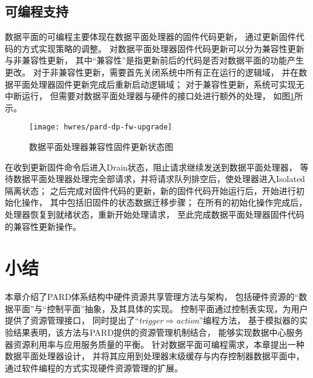 \subsection{可编程支持}

数据平面的可编程主要体现在数据平面处理器的固件代码更新，
通过更新固件代码的方式实现策略的调整。
对数据平面处理器固件代码更新可以分为兼容性更新与非兼容性更新，
其中``兼容性''是指更新前后的代码是否对数据平面的功能产生更改。
对于非兼容性更新，需要首先关闭系统中所有正在运行的逻辑域，
并在数据平面处理器固件更新完成后重新启动逻辑域；
对于兼容性更新，系统可实现无中断运行，
但需要对数据平面处理器与硬件的接口处进行额外的处理，
如图\ref{fig:pard-dp-fw-upgrade}所示。

\begin{figure}[htb]
  \centering
  \texttt{[image: hwres/pard-dp-fw-upgrade]}
  \caption{数据平面处理器兼容性固件更新状态图}
  \label{fig:pard-dp-fw-upgrade}
\end{figure}

在收到更新固件命令后进入Drain状态，阻止请求继续发送到数据平面处理器，
等待数据平面处理器处理完全部请求，并将请求队列排空后，使处理器进入Isolated隔离状态；
之后完成对固件代码的更新，新的固件代码开始运行后，开始进行初始化操作，
其中包括旧固件的状态数据迁移步骤；
在所有的初始化操作完成后，处理器恢复到就绪状态，重新开始处理请求，
至此完成数据平面处理器固件代码的兼容性更新操作。


\section{小结}

本章介绍了PARD体系结构中硬件资源共享管理方法与架构，
包括硬件资源的``数据平面''与``控制平面''抽象，及其具体的实现。
控制平面通过控制表实现，为用户提供了资源管理接口，
同时提出了``\emph{trigger$\Rightarrow$action}''编程方法，
基于模拟器的实验结果表明，该方法与PARD提供的资源管理机制结合，
能够实现数据中心服务器资源利用率与应用服务质量的平衡。
针对数据平面可编程需求，本章提出一种数据平面处理器设计，
并将其应用到处理器末级缓存与内存控制器数据平面中，
通过软件编程的方式实现硬件资源管理的扩展。


